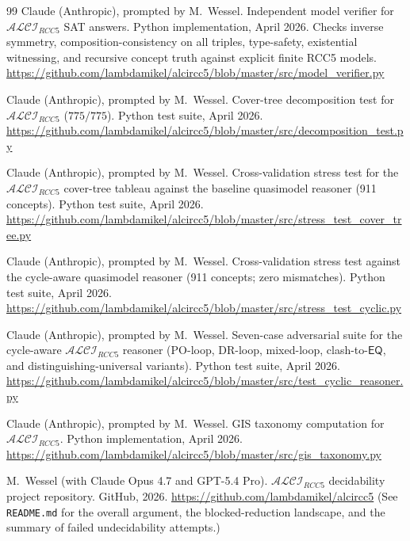 \documentclass[
]{ceurart}
\theoremstyle{definition}
\newcommand{\ALCIRCC}[1]{\ensuremath{\mathcal{ALCI}_{\mathit{RCC#1}}}}
\newcommand{\EQ}{\ensuremath{\mathsf{EQ}}}
\begin{document}
\begin{thebibliography}{99}
Claude (Anthropic), prompted by M.\ Wessel.
\newblock Independent model verifier for $\ALCIRCC{5}$ SAT answers.
\newblock Python implementation, April 2026.
\newblock Checks inverse symmetry, composition-consistency on all
  triples, type-safety, existential witnessing, and recursive
  concept truth against explicit finite RCC5 models.
\newblock \url{https://github.com/lambdamikel/alcircc5/blob/master/src/model_verifier.py}

Claude (Anthropic), prompted by M.\ Wessel.
\newblock Cover-tree decomposition test for $\ALCIRCC{5}$
  ($775/775$).
\newblock Python test suite, April 2026.
\newblock \url{https://github.com/lambdamikel/alcircc5/blob/master/src/decomposition_test.py}

Claude (Anthropic), prompted by M.\ Wessel.
\newblock Cross-validation stress test for the $\ALCIRCC{5}$
  cover-tree tableau against the baseline quasimodel reasoner
  (911 concepts).
\newblock Python test suite, April 2026.
\newblock \url{https://github.com/lambdamikel/alcircc5/blob/master/src/stress_test_cover_tree.py}

Claude (Anthropic), prompted by M.\ Wessel.
\newblock Cross-validation stress test against the cycle-aware
  quasimodel reasoner (911 concepts; zero mismatches).
\newblock Python test suite, April 2026.
\newblock \url{https://github.com/lambdamikel/alcircc5/blob/master/src/stress_test_cyclic.py}

Claude (Anthropic), prompted by M.\ Wessel.
\newblock Seven-case adversarial suite for the cycle-aware
  $\ALCIRCC{5}$ reasoner (PO-loop, DR-loop, mixed-loop,
  clash-to-$\EQ$, and distinguishing-universal variants).
\newblock Python test suite, April 2026.
\newblock \url{https://github.com/lambdamikel/alcircc5/blob/master/src/test_cyclic_reasoner.py}

Claude (Anthropic), prompted by M.\ Wessel.
\newblock GIS taxonomy computation for $\ALCIRCC{5}$.
\newblock Python implementation, April 2026.
\newblock \url{https://github.com/lambdamikel/alcircc5/blob/master/src/gis_taxonomy.py}

M.\ Wessel (with Claude Opus 4.7 and GPT-5.4 Pro).
\newblock $\ALCIRCC{5}$ decidability project repository.
\newblock GitHub, 2026.
\newblock \url{https://github.com/lambdamikel/alcircc5}
\newblock (See \texttt{README.md} for the overall argument, the
  blocked-reduction landscape, and the summary of failed
  undecidability attempts.)


\end{thebibliography}
\end{document}
